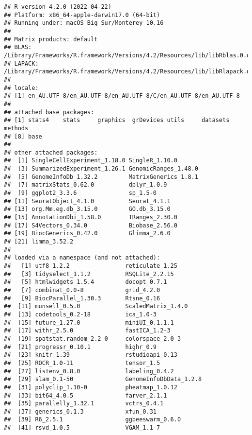 \documentclass[
  openany]{book}
\begin{document}
\begin{verbatim}
## R version 4.2.0 (2022-04-22)
## Platform: x86_64-apple-darwin17.0 (64-bit)
## Running under: macOS Big Sur/Monterey 10.16
## 
## Matrix products: default
## BLAS:   /Library/Frameworks/R.framework/Versions/4.2/Resources/lib/libRblas.0.dylib
## LAPACK: /Library/Frameworks/R.framework/Versions/4.2/Resources/lib/libRlapack.dylib
## 
## locale:
## [1] en_AU.UTF-8/en_AU.UTF-8/en_AU.UTF-8/C/en_AU.UTF-8/en_AU.UTF-8
## 
## attached base packages:
## [1] stats4    stats     graphics  grDevices utils     datasets  methods  
## [8] base     
## 
## other attached packages:
##  [1] SingleCellExperiment_1.18.0 SingleR_1.10.0             
##  [3] SummarizedExperiment_1.26.1 GenomicRanges_1.48.0       
##  [5] GenomeInfoDb_1.32.2         MatrixGenerics_1.8.1       
##  [7] matrixStats_0.62.0          dplyr_1.0.9                
##  [9] ggplot2_3.3.6               sp_1.5-0                   
## [11] SeuratObject_4.1.0          Seurat_4.1.1               
## [13] org.Mm.eg.db_3.15.0         GO.db_3.15.0               
## [15] AnnotationDbi_1.58.0        IRanges_2.30.0             
## [17] S4Vectors_0.34.0            Biobase_2.56.0             
## [19] BiocGenerics_0.42.0         Glimma_2.6.0               
## [21] limma_3.52.2               
## 
## loaded via a namespace (and not attached):
##   [1] utf8_1.2.2                reticulate_1.25          
##   [3] tidyselect_1.1.2          RSQLite_2.2.15           
##   [5] htmlwidgets_1.5.4         docopt_0.7.1             
##   [7] combinat_0.0-8            grid_4.2.0               
##   [9] BiocParallel_1.30.3       Rtsne_0.16               
##  [11] munsell_0.5.0             ScaledMatrix_1.4.0       
##  [13] codetools_0.2-18          ica_1.0-3                
##  [15] future_1.27.0             miniUI_0.1.1.1           
##  [17] withr_2.5.0               fastICA_1.2-3            
##  [19] spatstat.random_2.2-0     colorspace_2.0-3         
##  [21] progressr_0.10.1          highr_0.9                
##  [23] knitr_1.39                rstudioapi_0.13          
##  [25] ROCR_1.0-11               tensor_1.5               
##  [27] listenv_0.8.0             labeling_0.4.2           
##  [29] slam_0.1-50               GenomeInfoDbData_1.2.8   
##  [31] polyclip_1.10-0           pheatmap_1.0.12          
##  [33] bit64_4.0.5               farver_2.1.1             
##  [35] parallelly_1.32.1         vctrs_0.4.1              
##  [37] generics_0.1.3            xfun_0.31                
##  [39] R6_2.5.1                  ggbeeswarm_0.6.0         
##  [41] rsvd_1.0.5                VGAM_1.1-7               

\end{verbatim}
\end{document}

